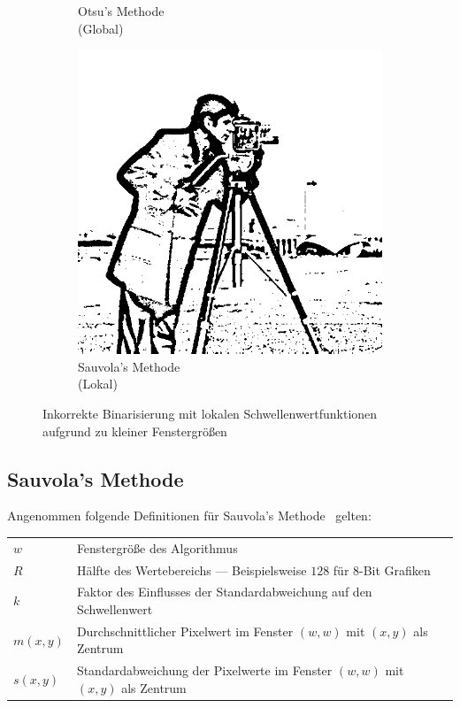 \begin{figure}
\begin{subfigure}[t]{0.3\textwidth}
        \caption{Otsu's Methode\\(Global)}%
    \end{subfigure}
    \hfill
    \begin{subfigure}[t]{0.3\textwidth}
        \centering
        \includegraphics[interpolate=true,width=\textwidth]{images/essentials_binarization_window_size_sauvola}
        \caption{Sauvola's Methode\\(Lokal)}%
    \end{subfigure}
    \caption{Inkorrekte Binarisierung mit lokalen Schwellenwertfunktionen aufgrund zu kleiner Fenstergrößen}%
    \label{fig:essentials_binarization_window_size}
\end{figure}

\clearpage
\subsection{Sauvola's Methode}%
\label{subsec:essentials_binarization_sauvola}

Angenommen folgende Definitionen für Sauvola's Methode~\cite{DBLP:journals/pr/SauvolaP00} gelten:

\begin{tabu}{lX}
    \(w\)      & Fenstergröße des Algorithmus \\
    \(R\)      & Hälfte des Wertebereichs --- Beispielsweise \(128\) für 8-Bit Grafiken \\
    \(k\)      & Faktor des Einflusses der Standardabweichung auf den Schwellenwert \\
    \(m(x,y)\) & Durchschnittlicher Pixelwert im Fenster \((w,w)\) mit \((x,y)\) als Zentrum \\
    \(s(x,y)\) & Standardabweichung der Pixelwerte im Fenster \((w,w)\) mit \((x,y)\) als Zentrum \\
\end{tabu}

